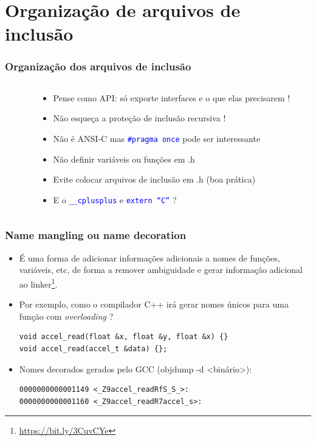 \documentclass{beamer}
\begin{document}
\section{Organização de arquivos de inclusão}
	
\begin{frame}
	\frametitle{Organização dos arquivos de inclusão}
	\begin{columns}[T] %
		\begin{column}{.450\textwidth}
			
		\end{column}%
		\hfill%
		\begin{column}{.55\textwidth}
			\begin{itemize}
				\item Pense como API: só exporte interfaces e o que elas precisarem !
				\item Não esqueça a proteção de inclusão recursiva !
				\item Não é ANSI-C mas \texttt{\textcolor{blue}{\#pragma once}} pode ser interessante
				\item Não definir variáveis ou funções em .h
				\item Evite colocar arquivos de inclusão em .h (boa prática)
                \item E o \texttt{\textcolor{blue}{\_\_cplusplus}} e \texttt{\textcolor{blue}{extern ``C''}} ?
			\end{itemize}
		\end{column}%
	\end{columns}
\end{frame}

\begin{frame}[fragile]
	\frametitle{Name mangling ou name decoration}
		\begin{itemize}
			\item É uma forma de adicionar informações adicionais a nomes de funções, variáveis, etc, de forma a remover ambiguidade e gerar informação adicional ao linker\footnote{{\tiny\url{ https://bit.ly/3CuvCYe}}}.
			\item Por exemplo, como o compilador C++ irá gerar nomes únicos para uma função com \textit{overloading} ?
            	\begin{lstlisting}[style=customc]
void accel_read(float &x, float &y, float &x) {}
void accel_read(accel_t &data) {};
            	\end{lstlisting}
               \item Nomes decorados gerados pelo GCC (objdump -d <binário>):
            	\begin{lstlisting}[style=customc]
0000000000001149 <_Z9accel_readRfS_S_>:
0000000000001160 <_Z9accel_readR7accel_s>:
            	\end{lstlisting}
		\end{itemize}
\end{frame}
\end{document}
